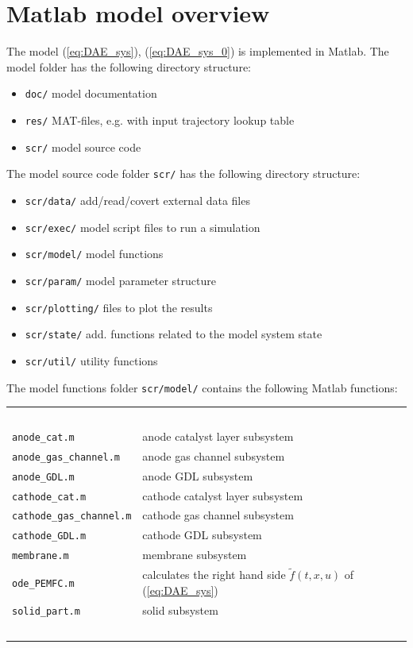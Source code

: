 \documentclass[pdftex,a4paper, 12pt]{article}
\begin{document}
\section{Matlab model overview}
\label{sec:overview}
%
The model (\ref{eq:DAE_sys}), (\ref{eq:DAE_sys_0}) is implemented in Matlab. The model folder has the following directory structure:
%
\begin{itemize}
	\item \texttt{doc/} model documentation
	\item \texttt{res/} MAT-files, e.g. with input trajectory lookup table
	\item \texttt{scr/} model source code
\end{itemize}
%
The model source code folder \texttt{scr/} has the following directory structure:
%
\begin{itemize}
	\item \texttt{scr/data/} add/read/covert external data files  
	\item \texttt{scr/exec/} model script files to run a simulation
	\item \texttt{scr/model/} model functions
	\item \texttt{scr/param/} model parameter structure
	\item \texttt{scr/plotting/} files to plot the results
	\item \texttt{scr/state/} add. functions related to the model system state
	\item \texttt{scr/util/} utility functions
\end{itemize}
%
The model functions folder \texttt{scr/model/} contains the following Matlab functions:
%
\begin{center}
	\begin{tabular}	{p{4.5cm} p{10.5cm}}
		~ & ~ \\
		\texttt{anode\_cat.m} &  anode catalyst layer subsystem \\
		\texttt{anode\_gas\_channel.m} &  anode gas channel subsystem \\
		\texttt{anode\_GDL.m} &  anode GDL subsystem \\
		\texttt{cathode\_cat.m} & cathode catalyst layer subsystem \\
		\texttt{cathode\_gas\_channel.m} & cathode gas channel subsystem \\
		\texttt{cathode\_GDL.m} & cathode GDL subsystem \\
		\texttt{membrane.m} & membrane subsystem \\
		\texttt{ode\_PEMFC.m} & calculates the right hand side $\tilde{f}(t,x,u)$ of (\ref{eq:DAE_sys}) \\
		\texttt{solid\_part.m} & solid subsystem \\
		~ & ~ \\
	\end{tabular}
\end{center}
\end{document}
